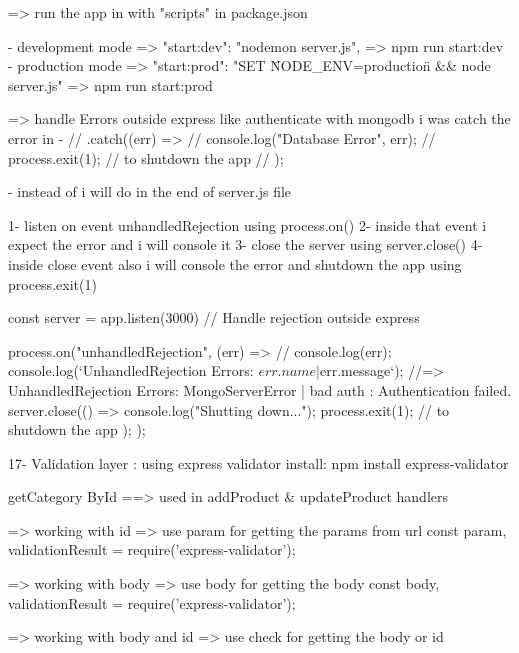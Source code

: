   => run the app in with "scripts" in package.json 

                - development mode => "start:dev": "nodemon server.js",
                    => npm run start:dev
                - production mode => "start:prod": "SET \"NODE_ENV=production\" && node server.js"
                    => npm run start:prod


 => handle Errors outside express like authenticate with mongodb
    i was catch the error in 
                            -   // .catch((err) => {
                                //   console.log("Database Error", err);
                                //   process.exit(1); // to shutdown the app
                                // });

    - instead of i will do in the end of server.js file 

                1- listen on event unhandledRejection using {process.on()}
                2- inside that event i expect the error and i will console it
                3- close the server using {server.close()}
                4- inside close  event also i will console the error and shutdown the app using{ process.exit(1)}

            const server = app.listen(3000)
            // Handle rejection outside express

            process.on("unhandledRejection", (err) => {
            // console.log(err);
            console.log(`UnhandledRejection Errors: ${err.name} | ${err.message}`); //=> UnhandledRejection Errors: MongoServerError | bad auth : Authentication failed.
            server.close(() => {
                console.log("Shutting down...");
                process.exit(1); // to shutdown the app
            });
            });



17- Validation layer : using express validator
            install: npm install express-validator
            
            getCategory ById ==> used in addProduct & updateProduct handlers

            => working with id => use param  for getting the params from url 
               const { param, validationResult } = require('express-validator');
            
            => working with body => use body  for getting the body 
               const { body, validationResult } = require('express-validator');

            => working with body and id => use check  for getting the body or id
            
